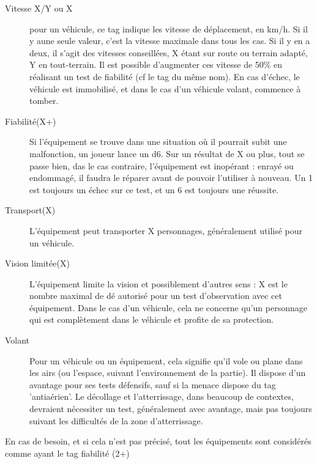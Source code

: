 \documentclass{report}
\begin{document}
\begin{multicols}{2}
\begin{description}
\item[Vitesse X/Y ou X] pour un véhicule, ce tag indique les vitesse de déplacement, en km/h. Si il y  aune seule valeur, c'est la vitesse maximale dans tous les cas. Si il y en a deux, il s'agit des vitesses conseillées, X étant sur route ou terrain adapté, Y en tout-terrain. Il est possible d'augmenter ces vitesse de 50\% en réalisant un test de fiabilité (cf le tag du même nom). En cas d'échec, le véhicule est immobilisé, et dans le cas d'un véhicule volant, commence à tomber.
\item[Fiabilité(X+)] Si l'équipement se trouve dans une situation où il pourrait subit une malfonction, un joueur lance un d6. Sur un résultat de X ou plus, tout se passe bien, das le cas contraire, l'équipement est inopérant : enrayé ou endommagé, il faudra le réparer avant de pouvoir l'utiliser à nouveau. Un 1 est toujours un échec sur ce test, et un 6 est toujours une réussite.
\item[Transport(X)] L'équipement peut transporter X personnages, généralement utilisé pour un véhicule.
\item[Vision limitée(X)]L'équipement limite la vision et possiblement d'autres sens : X est le nombre maximal de dé autorisé pour un test d'observation avec cet équipement. Dans le cas d'un véhicule, cela ne concerne qu'un personnage qui est complètement dans le véhicule et profite de sa protection.
\item[Volant]Pour un véhicule ou un équipement, cela signifie qu'il vole ou plane dans les airs (ou l'espace, suivant l'environnement de la partie). Il dispose d'un avantage pour ses tests défensifs, sauf si la menace dispose du tag 'antiaérien'. Le décollage et l'atterrissage, dans beaucoup de contextes, devraient nécessiter un test, généralement avec avantage, mais pas toujours suivant les difficultés de la zone d'atterrissage.
\end{description}

En cas de besoin, et si cela n'est pas précisé, tout les équipements sont considérés comme ayant le tag fiabilité (2+)

\end{multicols}
\end{document}
